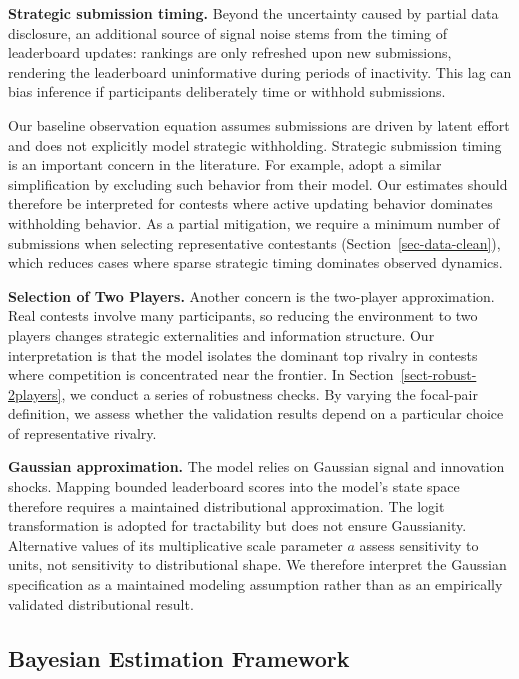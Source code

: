 \documentclass[mnsc]{informs3}
\begin{document}
\textbf{Strategic submission timing.}
Beyond the uncertainty caused by partial data disclosure, an additional source of signal noise stems from the timing of leaderboard updates: rankings are only refreshed upon new submissions, rendering the leaderboard uninformative during periods of inactivity.
This lag can bias inference if participants deliberately time or withhold submissions.


Our baseline observation equation assumes submissions are driven by latent effort and does not explicitly model strategic withholding.
Strategic submission timing is an important concern in the literature.
For example, \citet{lemus2021dynamic} adopt a similar simplification by excluding such behavior from their model.
Our estimates should therefore be interpreted for contests where active updating behavior dominates withholding behavior.
As a partial mitigation, we require a minimum number of submissions when selecting representative contestants (Section~\ref{sec-data-clean}), which reduces cases where sparse strategic timing dominates observed dynamics.


\textbf{Selection of Two Players.}
Another concern is the two-player approximation.
Real contests involve many participants, so reducing the environment to two players changes strategic externalities and information structure.
Our interpretation is that the model isolates the dominant top rivalry in contests where competition is concentrated near the frontier.
In Section~\ref{sect-robust-2players}, we conduct a series of robustness checks.
By varying the focal-pair definition, we assess whether the validation results depend on a particular choice of representative rivalry.

\textbf{Gaussian approximation.}
The model relies on Gaussian signal and innovation shocks. Mapping bounded leaderboard scores into the model's state space therefore requires a maintained distributional approximation. The logit transformation is adopted for tractability but does not ensure Gaussianity. Alternative values of its multiplicative scale parameter $a$ assess sensitivity to units, not sensitivity to distributional shape. We therefore interpret the Gaussian specification as a maintained modeling assumption rather than as an empirically validated distributional result.



\subsection{Bayesian Estimation Framework}
\end{document}
